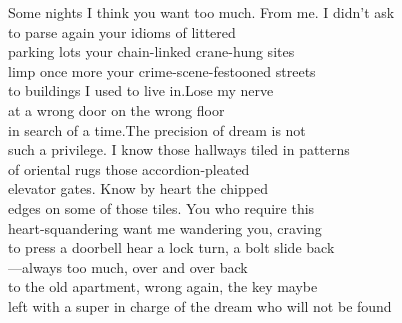 \documentclass[parskip=half-,12pt,oneside,openany,a5paper,numbers=endperiod]{scrbook}
\begin{document}
Some nights I think you want too much. From me. I didn't ask\\
to parse again your idioms of littered\\
parking lots your chain-linked crane-hung sites\\
limp once more your crime-scene-festooned streets\\
to buildings I used to live in.\quad Lose my nerve\\
at a wrong door on the wrong floor\\
in search of a time.\quad The precision of dream is not\\
such a privilege. I know those hallways tiled in patterns\\
of oriental rugs those accordion-pleated\\
elevator gates. Know by heart the chipped\\
edges on some of those tiles. You who require this\\
heart-squandering want me wandering you, craving\\
to press a doorbell hear a lock turn, a bolt slide back\\
---always too much, over and over back\\
to the old apartment, wrong again, the key maybe\\
left with a super in charge of the dream who will not be found

\end{document}
